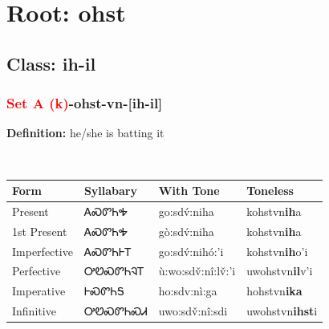 \needspace{4in}
\section*{Root: ohst}
\nopagebreak
{}
\needspace{3in}
\subsection*{Class: ih-il}
\nopagebreak
\needspace{2in}
\subsubsection*{\textcolor{Red}{Set A (k)}{-}\textbf{ohst}{-}vn{-}[ih-il]}
\nopagebreak
\textbf{Definition: } he/she is batting it
\\[0.5em]
\begin{tabularx}{\textwidth}{l X X X}%
\toprule%
\textbf{Form}&\textbf{Syllabary}&\textbf{With Tone}&\textbf{Toneless}\\%
\midrule%
Present&ᎪᏍᏛᏂᎭ&go:sdv́:niha&kohstvn\textbf{ih}a\\%
1st Present&ᎪᏍᏛᏂᎭ&gò:sdv́:niha&kohstvn\textbf{ih}a\\%
Imperfective&ᎪᏍᏛᏂᎰᎢ&go:sdv́:nihó:’i&kohstvn\textbf{ih}o'i\\%
Perfective&ᎤᏬᏍᏛᏂᎸᎢ&ù:wo:sdv̌:nî:lv̌:’i&uwohstvn\textbf{il}v'i\\%
Imperative&ᎰᏍᏛᏂᎦ&ho:sdv:nì:ga&hohstvn\textbf{ika}\\%
Infinitive&ᎤᏬᏍᏛᏂᏍᏗ&uwo:sdv̌:nî:sdi&uwohstvn\textbf{ihst}i\\%
\bottomrule%
\end{tabularx}
\\[1em]